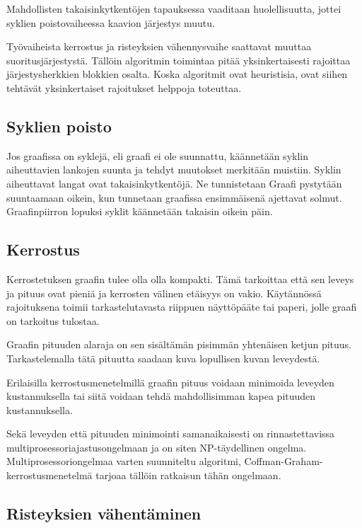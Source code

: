 \documentclass[finnish,12pt]{article}
\begin{document}
Mahdollisten takaisinkytkentöjen tapauksessa vaaditaan huolellisuutta, jottei syklien poistovaiheessa kaavion järjestys muutu.

Työvaiheista kerrostus ja risteyksien vähennysvaihe saattavat muuttaa suoritusjärjestystä.
Tällöin algoritmin toimintaa pitää yksinkertaisesti rajoittaa järjestysherkkien blokkien osalta.
Koska algoritmit ovat heuristisia, ovat siihen tehtävät yksinkertaiset rajoitukset helppoja toteuttaa.

		\subsection{Syklien poisto}

Jos graafissa on syklejä, eli graafi ei ole suunnattu, käännetään syklin aiheuttavien lankojen suunta ja tehdyt muutokset merkitään muistiin.
Syklin aiheuttavat langat ovat takaisinkytkentöjä. Ne tunnistetaan 
Graafi pystytään suuntaamaan oikein, kun tunnetaan graafissa ensimmäisenä ajettavat solmut.
Graafinpiirron lopuksi syklit käännetään takaisin oikein päin.

		\subsection{Kerrostus}

Kerrostetuksen graafin tulee olla olla kompakti.
Tämä tarkoittaa että sen leveys ja pituus ovat pieniä ja kerrosten välinen etäisyys on vakio.
Käytännössä rajoituksena toimii tarkastelutavasta riippuen näyttöpääte tai paperi, jolle graafi on tarkoitus tulostaa.

Graafin pituuden alaraja on sen sisältämän pisimmän yhtenäisen ketjun pituus. Tarkastelemalla tätä pituutta saadaan kuva lopullisen kuvan leveydestä.

Erilaisilla kerrostusmenetelmillä graafin pituus voidaan minimoida leveyden kustannuksella tai siitä voidaan tehdä mahdollisimman kapea pituuden kustannuksella.

Sekä leveyden että pituuden minimointi samanaikaisesti on rinnastettavissa multiprosessoriajastusongelmaan ja on siten NP-täydellinen ongelma. \cite{RefWorks:39}
Multiprosessoriongelmaa varten suunniteltu algoritmi, Coffman-Graham-kerrostusmenetelmä tarjoaa tällöin ratkaisun tähän ongelmaan.

		\subsection{Risteyksien vähentäminen}
\end{document}
